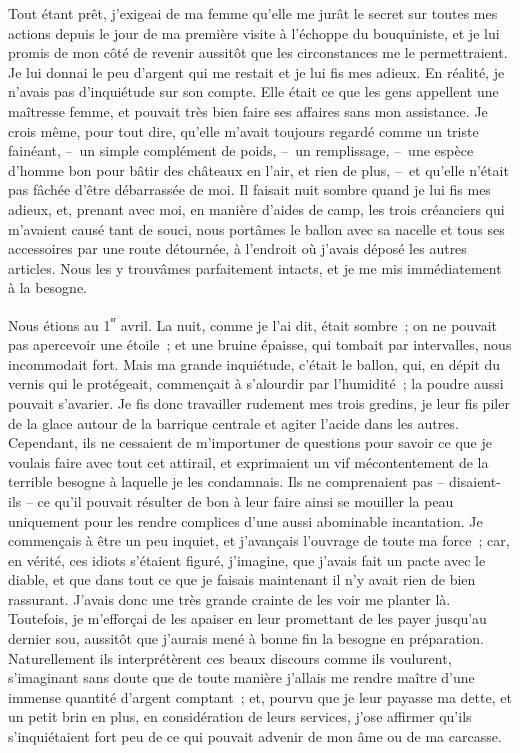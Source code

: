 \documentclass[french,twoside]{book} %
\begin{document}
Tout étant prêt, j’exigeai de ma femme qu’elle me jurât le secret sur toutes mes actions depuis le jour de ma première visite à l’échoppe du bouquiniste, et je lui promis de mon côté de revenir aussitôt que les circonstances me le permettraient. Je lui donnai le peu d’argent qui me restait et je lui fis mes adieux. En réalité, je n’avais pas d’inquiétude sur son compte. Elle était ce que les gens appellent une maîtresse femme, et pouvait très bien faire ses affaires sans mon assistance. Je crois même, pour tout dire, qu’elle m’avait toujours regardé comme un triste fainéant, – un simple complément de poids, – un remplissage, – une espèce d’homme bon pour bâtir des châteaux en l’air, et rien de plus, – et qu’elle n’était pas fâchée d’être débarrassée de moi. Il faisait nuit sombre quand je lui fis mes adieux, et, prenant avec moi, en manière d’aides de camp, les trois créanciers qui m’avaient causé tant de souci, nous portâmes le ballon avec sa nacelle et tous ses accessoires par une route détournée, à l’endroit où j’avais déposé les autres articles. Nous les y trouvâmes parfaitement intacts, et je me mis immédiatement à la besogne.\par
Nous étions au 1\textsuperscript{ᵉʳ} avril. La nuit, comme je l’ai dit, était sombre ; on ne pouvait pas apercevoir une étoile ; et une bruine épaisse, qui tombait par intervalles, nous incommodait fort. Mais ma grande inquiétude, c’était le ballon, qui, en dépit du vernis qui le protégeait, commençait à s’alourdir par l’humidité ; la poudre aussi pouvait s’avarier. Je fis donc travailler rudement mes trois gredins, je leur fis piler de la glace autour de la barrique centrale et agiter l’acide dans les autres. Cependant, ils ne cessaient de m’importuner de questions pour savoir ce que je voulais faire avec tout cet attirail, et exprimaient un vif mécontentement de la terrible besogne à laquelle je les condamnais. Ils ne comprenaient pas – disaient-ils – ce qu’il pouvait résulter de bon à leur faire ainsi se mouiller la peau uniquement pour les rendre complices d’une aussi abominable incantation. Je commençais à être un peu inquiet, et j’avançais l’ouvrage de toute ma force ; car, en vérité, ces idiots s’étaient figuré, j’imagine, que j’avais fait un pacte avec le diable, et que dans tout ce que je faisais maintenant il n’y avait rien de bien rassurant. J’avais donc une très grande crainte de les voir me planter là. Toutefois, je m’efforçai de les apaiser en leur promettant de les payer jusqu’au dernier sou, aussitôt que j’aurais mené à bonne fin la besogne en préparation. Naturellement ils interprétèrent ces beaux discours comme ils voulurent, s’imaginant sans doute que de toute manière j’allais me rendre maître d’une immense quantité d’argent comptant ; et, pourvu que je leur payasse ma dette, et un petit brin en plus, en considération de leurs services, j’ose affirmer qu’ils s’inquiétaient fort peu de ce qui pouvait advenir de mon âme ou de ma carcasse.\par
\end{document}
